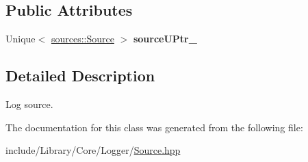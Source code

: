 \subsection*{Public Attributes}
\begin{DoxyCompactItemize}
\item 
\mbox{\label{classlibrary_1_1core_1_1logger_1_1_source_a9461165d5d581171a044200b58007a3a}} 
Unique$<$ \hyperlink{classlibrary_1_1core_1_1logger_1_1sources_1_1_source}{sources\+::\+Source} $>$ {\bfseries source\+U\+Ptr\+\_\+}
\end{DoxyCompactItemize}


\subsection{Detailed Description}
Log source. 

The documentation for this class was generated from the following file\+:\begin{DoxyCompactItemize}
\item 
include/\+Library/\+Core/\+Logger/\hyperlink{_source_8hpp}{Source.\+hpp}\end{DoxyCompactItemize}
